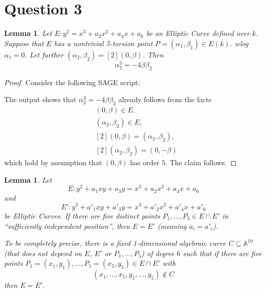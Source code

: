 \documentclass{scrartcl}
\newtheorem{lemma}[prop]{Lemma}
\theoremstyle{definition}
\begin{document}
\section*{Question 3}
\begin{lemma}
    \label{prop:relation_y_uv}
    Let $E: y^2 = x^3 + a_2 x^2 + a_4 x + a_6$ be an Elliptic Curve defined over $k$.
    Suppose that $E$ has a nontrivial 5-torsion point $P = (\alpha_1, \beta_1) \in E(k)$.
    wlog $\alpha_1 = 0$.
    Let further $(\alpha_2, \beta_2) = [2](0, \beta)$.
    Then
    \begin{equation*}
        \alpha_2^3 = -4\beta\beta_2
    \end{equation*}
\end{lemma}
\begin{proof}
    Consider the following SAGE script:
    
    The output shows that $\alpha_2^3 = -4 \beta \beta_2$ already follows from the facts
    \begin{align*}
        &(0, \beta) \in E, \\
        &(\alpha_2, \beta_2) \in E, \\
        &[2](0, \beta) = (\alpha_2, \beta_2), \\
        &[2](\alpha_2, \beta_2) = (0, -\beta)
    \end{align*}
    which hold by assumption that $(0, \beta)$ has order $5$.
    The claim follows.
\end{proof}
\begin{lemma}
    Let
    \begin{equation*}
        E: y^2 + a_1 x y + a_3 y = x^3 + a_2 x^2 + a_4 x + a_6    
    \end{equation*}
    and
    \begin{equation*}
        E': y^2 + a'_1 x y + a'_3 y = x^3 + a'_2 x^2 + a'_4 x + a'_6    
    \end{equation*}
    be Elliptic Curves.
    If there are five distinct points $P_1, ..., P_5 \in E \cap E'$ in ``sufficiently independent position'', then $E = E'$ (meaning $a_i = a'_i$).

    To be completely precise, there is a fixed 1-dimensional algebraic curve $C \subseteq \mathbb{A}^{10}$ (that does not depend on $E$, $E'$ or $P_1, ..., P_5$) of degree $6$ such that if there are five points $P_1 = (x_1, y_1), ..., P_5 = (x_5, y_5) \in E \cap E'$ with
    \begin{equation*}
        (x_1, ..., x_5, y_1, ..., y_5) \notin C
    \end{equation*}
    then $E = E'$.
\end{lemma}
\end{document}

